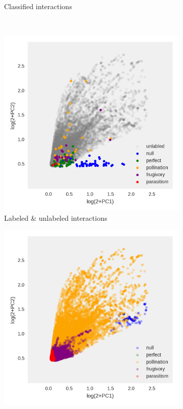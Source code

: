 \begin{figure}
\begin{subfigure}[b]{0.45\textwidth}
        \caption{Classified interactions}
    \end{subfigure}\\
        \begin{subfigure}[b]{0.45\textwidth}
        \includegraphics[width=\textwidth]{FishPoo/figures/codiv_literature_fishpoo_classified_PCA_a.png}
        \caption{Labeled \& unlabeled interactions}
    \end{subfigure}
        \begin{subfigure}[b]{0.45\textwidth}
        \includegraphics[width=\textwidth]{FishPoo/figures/codiv_literature_fishpoo_classified_PCA_b.png}

\end{subfigure}
\end{figure}
